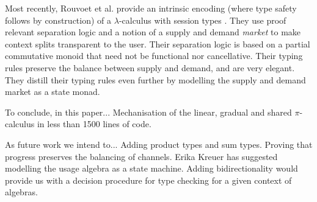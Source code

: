\documentclass[a4paper,UKenglish,cleveref,autoref,thm-restate,authorcolumns]{lipics-v2019}
\theoremstyle{definition}
\newcommand{\lambdacalc}{$\lambda$-calculus}
\newcommand{\picalc}{$\pi$-calculus}
\begin{document}
Most recently, Rouvoet et al. provide an intrinsic encoding (where type safety follows by construction) of a \lambdacalc{} with session types \cite{Rouvoet2020}.
They use proof relevant separation logic and a notion of a supply and demand \emph{market} to make context splits transparent to the user.
Their separation logic is based on a partial commutative monoid that need not be functional nor cancellative.
Their typing rules preserve the balance between supply and demand, and are very elegant.
They distill their typing rules even further by modelling the supply and demand market as a state monad.


To conclude, in this paper...
Mechanisation of the linear, gradual and shared \picalc{} in less than 1500 lines of code.

As future work we intend to...
Adding product types and sum types.
Proving that progress preserves the balancing of channels.
Erika Kreuer has suggested modelling the usage algebra as a state machine.
Adding bidirectionality would provide us with a decision procedure for type checking for a given context of algebras.

\newpage


\newpage
\appendix

\end{document}
